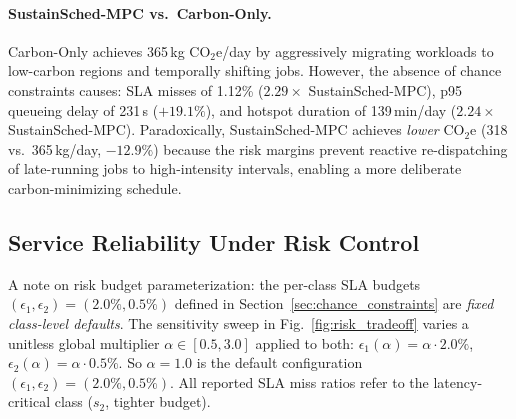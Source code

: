 \documentclass[a4paper,fleqn]{cas-dc}
\begin{document}
\paragraph{SustainSched-MPC vs.\ Carbon-Only.}
Carbon-Only achieves 365\,kg CO$_2$e/day by aggressively migrating workloads to low-carbon regions and temporally shifting jobs. However, the absence of chance constraints causes: SLA misses of 1.12\% ($2.29\times$ SustainSched-MPC), p95 queueing delay of 231\,s ($+19.1\%$), and hotspot duration of 139\,min/day ($2.24\times$ SustainSched-MPC). Paradoxically, SustainSched-MPC achieves \emph{lower} CO$_2$e (318 vs.\ 365\,kg/day, $-12.9\%$) because the risk margins prevent reactive re-dispatching of late-running jobs to high-intensity intervals, enabling a more deliberate carbon-minimizing schedule.

\subsection{Service Reliability Under Risk Control}
\label{sec:service_reliability}

A note on risk budget parameterization: the per-class SLA budgets $(\epsilon_1, \epsilon_2) = (2.0\%, 0.5\%)$ defined in Section~\ref{sec:chance_constraints} are \emph{fixed class-level defaults}. The sensitivity sweep in Fig.~\ref{fig:risk_tradeoff} varies a unitless global multiplier $\alpha \in [0.5, 3.0]$ applied to both: $\epsilon_1(\alpha) = \alpha \cdot 2.0\%$, $\epsilon_2(\alpha) = \alpha \cdot 0.5\%$. So $\alpha=1.0$ is the default configuration $(\epsilon_1, \epsilon_2) = (2.0\%, 0.5\%)$. All reported SLA miss ratios refer to the latency-critical class ($s_2$, tighter budget).
\end{document}
